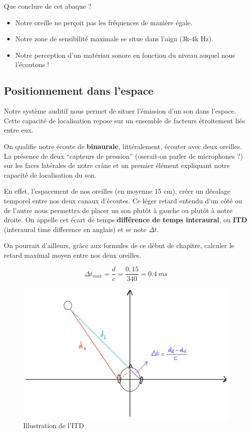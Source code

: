 \documentclass[
]{book}
\providecommand{\tightlist}{%
  \setlength{\itemsep}{0pt}\setlength{\parskip}{0pt}}
\begin{document}
Que conclure de cet abaque ?

\begin{itemize}
\tightlist
\item
  Notre oreille ne perçoit pas les fréquences de manière égale.
\item
  Notre zone de sensibilité maximale se situe dans l'aigu (3k-4k Hz).
\item
  Notre perception d'un matériau sonore en fonction du niveau auquel nous l'écoutons !
\end{itemize}

\hypertarget{positionnement-dans-lespace}{%
\subsection{Positionnement dans l'espace}\label{positionnement-dans-lespace}}

Notre système auditif nous permet de situer l'émission d'un son dans l'espace. Cette capacité de localisation repose sur un ensemble de facteurs étroitement liés entre eux.

On qualifie notre écoute de \textbf{binaurale}, littéralement, écouter avec deux oreilles. La présence de deux ``capteurs de pression'' (oserait-on parler de microphones ?) sur les faces latérales de notre crâne et un premier élément expliquant notre capacité de localisation du son.

En effet, l'espacement de nos oreilles (en moyenne 15 cm), créer un décalage temporel entre nos deux canaux d'écoutes. Ce léger retard entendu d'un côté ou de l'autre nous permettra de placer un son plutôt à gauche ou plutôt à notre droite. On appelle cet écart de temps \textbf{différence de temps interaural}, ou \textbf{ITD} (interaural time difference en anglais) et se note \(\Delta t\).

On pourrait d'ailleurs, grâce aux formules de ce début de chapitre, calculer le retard maximal moyen entre nos deux oreilles.

\[\Delta t_{max} = \frac d c = \frac {0,15}{340} = 0.4 \> ms\]

\begin{figure}

{\centering \includegraphics{_resources/drawings/delta_t} 

}

\caption{Illustration de l'ITD}\label{fig:unnamed-chunk-8}
\end{figure}
\end{document}
